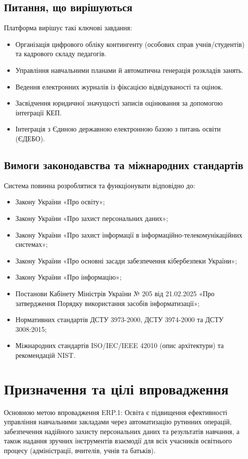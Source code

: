 \documentclass{article}
\begin{document}
\subsection{Питання, що вирішуються}
Платформа вирішує такі ключові завдання:
\begin{itemize}
    \item Організація цифрового обліку контингенту (особових справ учнів/студентів) та кадрового складу педагогів.
    \item Управління навчальними планами й автоматична генерація розкладів занять.
    \item Ведення електронних журналів із фіксацією відвідуваності та оцінок.
    \item Засвідчення юридичної значущості записів оцінювання за допомогою інтеграції КЕП.
    \item Інтеграція з Єдиною державною електронною базою з питань освіти (ЄДЕБО).
\end{itemize}

\subsection{Вимоги законодавства та міжнародних стандартів}
Система повинна розроблятися та функціонувати відповідно до:
\begin{itemize}
    \item Закону України «Про освіту»;
    \item Закону України «Про захист персональних даних»;
    \item Закону України «Про захист інформації в інформаційно-телекомунікаційних системах»;
    \item Закону України «Про основні засади забезпечення кібербезпеки України»;
    \item Закону України «Про інформацію»;
    \item Постанови Кабінету Міністрів України № 205 від 21.02.2025 «Про затвердження Порядку використання засобів інформатизації»;
    \item Нормативних стандартів ДСТУ 3973-2000, ДСТУ 3974-2000 та ДСТУ 3008:2015;
    \item Міжнародних стандартів ISO/IEC/IEEE 42010 (опис архітектури) та рекомендацій NIST.
\end{itemize}

\section{Призначення та цілі впровадження}
Основною метою впровадження ERP.1: Освіта є підвищення ефективності управління навчальними закладами через автоматизацію рутинних операцій, забезпечення надійного захисту персональних даних та результатів навчання, а також надання зручних інструментів взаємодії для всіх учасників освітнього процесу (адміністрації, вчителів, учнів та батьків).
\end{document}
